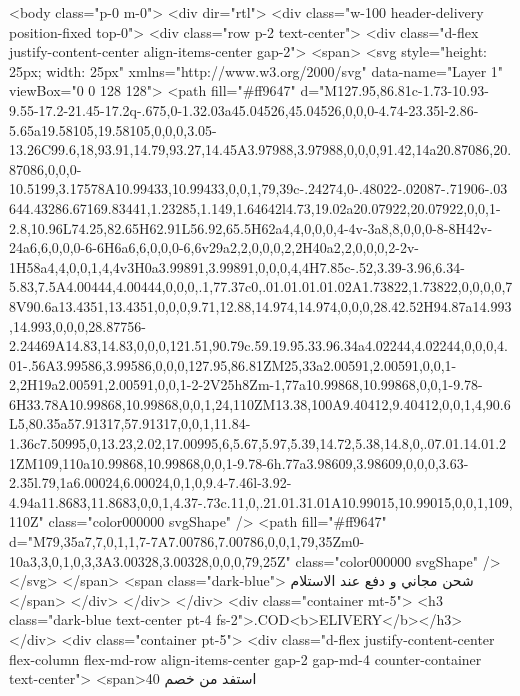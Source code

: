   <body  class="p-0 m-0">
<div dir="rtl">
    <div class="w-100 header-delivery position-fixed top-0">
      <div class="row p-2 text-center">
        <div class="d-flex justify-content-center align-items-center gap-2">
          <span>
            <svg style="height: 25px; width: 25px" xmlns="http://www.w3.org/2000/svg" data-name="Layer 1"
              viewBox="0 0 128 128">
              <path fill="#ff9647"
                d="M127.95,86.81c-1.73-10.93-9.55-17.2-21.45-17.2q-.675,0-1.32.03a45.04526,45.04526,0,0,0-4.74-23.35l-2.86-5.65a19.58105,19.58105,0,0,0,3.05-13.26C99.6,18,93.91,14.79,93.27,14.45A3.97988,3.97988,0,0,0,91.42,14a20.87086,20.87086,0,0,0-10.5199,3.17578A10.99433,10.99433,0,0,1,79,39c-.24274,0-.48022-.02087-.71906-.03644.43286.67169.83441,1.23285,1.149,1.64642l4.73,19.02a20.07922,20.07922,0,0,1-2.8,10.96L74.25,82.65H62.91L56.92,65.5H62a4,4,0,0,0,4-4v-3a8,8,0,0,0-8-8H42v-24a6,6,0,0,0-6-6H6a6,6,0,0,0-6,6v29a2,2,0,0,0,2,2H40a2,2,0,0,0,2-2v-1H58a4,4,0,0,1,4,4v3H0a3.99891,3.99891,0,0,0,4,4H7.85c-.52,3.39-3.96,6.34-5.83,7.5A4.00444,4.00444,0,0,0,.1,77.37c0,.01.01.01.01.02A1.73822,1.73822,0,0,0,0,78V90.6a13.4351,13.4351,0,0,0,9.71,12.88,14.974,14.974,0,0,0,28.42.52H94.87a14.993,14.993,0,0,0,28.87756-2.24469A14.83,14.83,0,0,0,121.51,90.79c.59.19.95.33.96.34a4.02244,4.02244,0,0,0,4.01-.56A3.99586,3.99586,0,0,0,127.95,86.81ZM25,33a2.00591,2.00591,0,0,1-2,2H19a2.00591,2.00591,0,0,1-2-2V25h8Zm-1,77a10.99868,10.99868,0,0,1-9.78-6H33.78A10.99868,10.99868,0,0,1,24,110ZM13.38,100A9.40412,9.40412,0,0,1,4,90.6L5,80.35a57.91317,57.91317,0,0,1,11.84-1.36c7.50995,0,13.23,2.02,17.00995,6,5.67,5.97,5.39,14.72,5.38,14.8,0,.07.01.14.01.21ZM109,110a10.99868,10.99868,0,0,1-9.78-6h.77a3.98609,3.98609,0,0,0,3.63-2.35l.79,1a6.00024,6.00024,0,1,0,9.4-7.46l-3.92-4.94a11.8683,11.8683,0,0,1,4.37-.73c.11,0,.21.01.31.01A10.99015,10.99015,0,0,1,109,110Z"
                class="color000000 svgShape" />
              <path fill="#ff9647"
                d="M79,35a7,7,0,1,1,7-7A7.00786,7.00786,0,0,1,79,35Zm0-10a3,3,0,1,0,3,3A3.00328,3.00328,0,0,0,79,25Z"
                class="color000000 svgShape" />
            </svg>
          </span>
          <span class="dark-blue"> شحن مجاني و دفع عند الاستلام </span>
        </div>
      </div>
    </div>
    <div class="container mt-5">
      <h3 class="dark-blue text-center pt-4 fs-2">.COD<b>ELIVERY</b></h3>
    </div>
    <div class="container pt-5">
      <div
        class="d-flex justify-content-center flex-column flex-md-row align-items-center gap-2 gap-md-4 counter-container text-center">
        <span>استفد من خصم 40%
